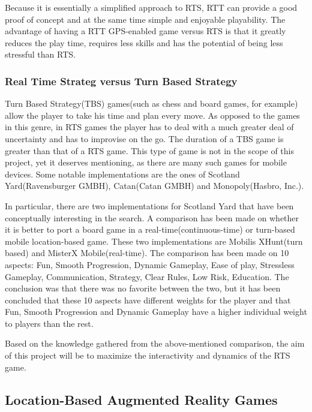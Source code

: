 Because it is essentially a simplified approach to RTS\cite{rttvsrts}, RTT can
provide a good proof of concept and at the same time simple and enjoyable
playability. The advantage of having a RTT GPS-enabled game versus RTS is that
it greatly reduces the play time, requires less skills and has the potential of
being less stressful than RTS.\newline

\subsubsection{Real Time Strateg versus Turn Based Strategy}

Turn Based Strategy(TBS) games\cite{rtsvstbs}(such as chess and board games, for
example) allow the player to take his time and plan every move. As opposed to
the games in this genre, in RTS games the player has to deal with a much greater
deal of uncertainty and has to improvise on the go. The duration of a TBS game
is greater than that of a RTS game. This type of game is not in the scope of
this project, yet it deserves mentioning, as there are many such games for
mobile devices. Some notable implementations are the ones of Scotland
Yard(Ravensburger GMBH), Catan(Catan GMBH) and Monopoly(Hasbro, Inc.).\newline

In particular, there are two implementations for Scotland Yard that have been
conceptually interesting in the search. A comparison has been
made\cite{rttvsrts2} on whether it is better to port a board game in a
real-time(continuous-time) or turn-based mobile location-based game. These two
implementations are Mobilis XHunt(turn based) and MisterX Mobile(real-time). The
comparison has been made on 10 aspects: Fun, Smooth Progression, Dynamic
Gameplay, Ease of play, Stressless Gameplay, Communication, Strategy, Clear
Rules, Low Risk, Education. The conclusion was that there was no favorite
between the two, but it has been concluded that these 10 aspects have different
weights for the player and that Fun, Smooth Progression and Dynamic Gameplay
have a higher individual weight to players than the rest.\cite[p.5]{rttvsrts2}
\newline

Based on the knowledge gathered from the above-mentioned comparison, the aim of
this project will be to maximize the interactivity and dynamics of the RTS game.


\subsection{Location-Based Augmented Reality Games}


